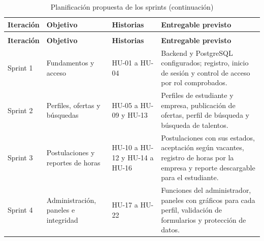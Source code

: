 \begin{longtable}{@{}>{\raggedright\arraybackslash}p{2.2cm}>{\raggedright\arraybackslash}p{4.0cm}>{\raggedright\arraybackslash}p{2.8cm}>{\raggedright\arraybackslash}p{7.0cm}@{}}
	\caption{Planificación propuesta de los sprints}\label{tab:planificacion-sprints}\\
	\hline
	\textbf{Iteración} & \textbf{Objetivo} & \textbf{Historias} & \textbf{Entregable previsto} \\
	\hline
	\endfirsthead
	\caption[]{Planificación propuesta de los sprints (continuación)}\\
	\hline
	\textbf{Iteración} & \textbf{Objetivo} & \textbf{Historias} & \textbf{Entregable previsto} \\
	\hline
	\endhead
	\hline
	\endlastfoot
	Sprint 1 & Fundamentos y acceso & HU-01 a HU-04 & Backend y PostgreSQL configurados; registro, inicio de sesión y control de acceso por rol comprobados. \\
	\hline
	Sprint 2 & Perfiles, ofertas y búsquedas & HU-05 a HU-09 y HU-13 & Perfiles de estudiante y empresa, publicación de ofertas, perfil de búsqueda y búsqueda de talentos. \\
	\hline
	Sprint 3 & Postulaciones y reportes de horas & HU-10 a HU-12 y HU-14 a HU-16 & Postulaciones con sus estados, aceptación según vacantes, registro de horas por la empresa y reporte descargable para el estudiante. \\
	\hline
	Sprint 4 & Administración, paneles e integridad & HU-17 a HU-22 & Funciones del administrador, paneles con gráficos para cada perfil, validación de formularios y protección de datos. \\
\end{longtable}



